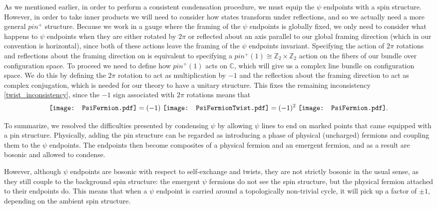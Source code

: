 \documentclass[12pt,a4paper]{article}
\newcommand{\cc}{\mathbb{C}}
\newcommand{\zt}{\mathbb{Z}_2}
\newcommand{\PsiFermion}{\mathord{\vcenter{\hbox{\texttt{[image: PsiFermion.pdf]}}}}}
\newcommand{\PsiFermionTwist}{\mathord{\vcenter{\hbox{\texttt{[image: PsiFermionTwist.pdf]}}}}}
\begin{document}
As we mentioned earlier, in order to perform a consistent condensation procedure, we must equip the $\psi$ endpoints with a spin structure. However, in order to take inner products we will need to consider how states transform under reflections, and so we actually need a more general $pin^+$ structure. Because we work in a gauge where the framing of the $\psi$ endpoints is globally fixed, we only need to consider what happens to $\psi$ endpoints when they are either rotated by $2\pi$ or reflected about an axis parallel to our global framing direction (which in our convention is horizontal), since both of these actions leave the framing of the $\psi$ endpoints invariant. Specifying the action of $2\pi$ rotations and reflections about the framing direction on is equivalent to specifying a $pin^+(1) \cong \zt \times \zt$ action on the fibers of our bundle over configuration space. To proceed we need to define how $pin^+(1)$ acts on $\cc$, which will give us a complex line bundle on configuration space. We do this by defining the $2\pi$ rotation to act as multiplication by $-1$ and the reflection about the framing direction to act as complex conjugation, which is needed for our theory to have a unitary structure. This fixes the remaining inconsistency \eqref{twist_inconsistency}, since the $-1$ sign associated with $2\pi$ rotations means that 
\begin{align} \label{boxspin}
\PsiFermion = (-1)\ \PsiFermionTwist = (-1)^2\ \PsiFermion. 
\end{align}

To summarize, we resolved the difficulties presented by condensing $\psi$ by allowing $\psi$ lines to end on marked points that came equipped with a pin structure. Physically, adding the pin structure can be regarded as introducing a phase of physical (uncharged) fermions and coupling them to the $\psi$ endpoints. The endpoints then become composites of a physical fermion and an emergent fermion, and as a result are bosonic and allowed to condense.

However, although $\psi$ endpoints are bosonic with respect to self-exchange and twists, they are not strictly bosonic in the usual sense, as they still couple to the background spin structure: the emergent $\psi$ fermions do not see the spin structure, but the physical fermion attached to their endpoints do. This means that when a $\psi$ endpoint is carried around a topologically non-trivial cycle, it will pick up a factor of $\pm1$, depending on the ambient spin structure. 
\end{document}
